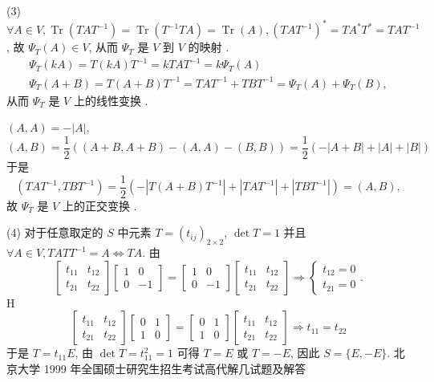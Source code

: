 \documentclass[10pt]{article}
\begin{document}
(3) $\forall A \in V, \operatorname{Tr}\left(T A T^{-1}\right)=\operatorname{Tr}\left(T^{-1} T A\right)=\operatorname{Tr}(A),\left(T A T^{-1}\right)^{*}=T A^{*} T^{*}=T A T^{-1}$,  故  $\Psi_{T}(A) \in V$,  从而  $\Psi_{T}$  是  $V$  到  $V$  的映射 .
$$
\begin{gathered}
\Psi_{T}(k A)=T(k A) T^{-1}=k T A T^{-1}=k \Psi_{T}(A) \\
\Psi_{T}(A+B)=T(A+B) T^{-1}=T A T^{-1}+T B T^{-1}=\Psi_{T}(A)+\Psi_{T}(B),
\end{gathered}
$$
 从而  $\Psi_{T}$  是  $V$  上的线性变换 .

$(A, A)=-|A|$,
$$
(A, B)=\frac{1}{2}((A+B, A+B)-(A, A)-(B, B))=\frac{1}{2}(-|A+B|+|A|+|B|)
$$
 于是 
$$
\left(T A T^{-1}, T B T^{-1}\right)=\frac{1}{2}\left(-\left|T(A+B) T^{-1}\right|+\left|T A T^{-1}\right|+\left|T B T^{-1}\right|\right)=(A, B),
$$
 故  $\Psi_{T}$  是  $V$  上的正交变换 .

(4)  对于任意取定的  $S$  中元素  $T=\left(t_{i j}\right)_{2 \times 2}$, $\operatorname{det} T=1$  并且  $\forall A \in V, T A T T^{-1}=A \Longleftrightarrow T A$.  由 
$$
\left[\begin{array}{ll}
t_{11} & t_{12} \\
t_{21} & t_{22}
\end{array}\right]\left[\begin{array}{cc}
1 & 0 \\
0 & -1
\end{array}\right]=\left[\begin{array}{cc}
1 & 0 \\
0 & -1
\end{array}\right]\left[\begin{array}{ll}
t_{11} & t_{12} \\
t_{21} & t_{22}
\end{array}\right] \Longrightarrow\left\{\begin{array}{l}
t_{12}=0 \\
t_{21}=0
\end{array} .\right.
$$
H
$$
\left[\begin{array}{ll}
t_{11} & t_{12} \\
t_{21} & t_{22}
\end{array}\right]\left[\begin{array}{ll}
0 & 1 \\
1 & 0
\end{array}\right]=\left[\begin{array}{ll}
0 & 1 \\
1 & 0
\end{array}\right]\left[\begin{array}{ll}
t_{11} & t_{12} \\
t_{21} & t_{22}
\end{array}\right] \Longrightarrow t_{11}=t_{22}
$$
 于是  $T=t_{11} E$,  由  $\operatorname{det} T=t_{11}^{2}=1$  可得  $T=E$  或  $T=-E$,  因此  $S=\{E,-E\}$.  北京大学  1999  年全国硕士研究生招生考试高代解几试题及解答 
\end{document}
